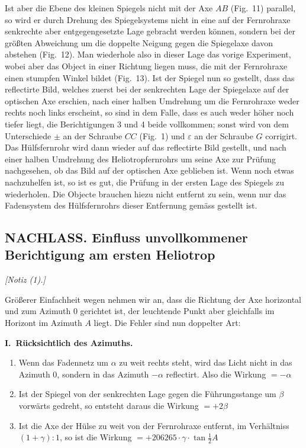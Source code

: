 \documentclass[12pt,a4paper]{article}
\newcommand{\tang}{\tan}
\theoremstyle{plain}
\theoremstyle{definition}
\theoremstyle{remark}
\begin{document}
Ist aber die Ebene des kleinen Spiegels nicht mit der Axe $AB$ (Fig.~11) parallel, so wird er durch Drehung des Spiegelsystems nicht in eine auf der Fernrohraxe senkrechte aber entgegengesetzte Lage gebracht werden k\"onnen, sondern bei der gr\"o\ss ten Abweichung um die doppelte Neigung gegen die Spiegelaxe davon abstehen (Fig.~12). Man wiederhole also in dieser Lage das vorige Experiment, wobei aber das Object in einer Richtung liegen muss, die mit der Fernrohraxe einen stumpfen Winkel bildet (Fig.~13). Ist der Spiegel nun so gestellt, dass das reflectirte Bild, welches zuerst bei der senkrechten Lage der Spiegelaxe auf der optischen Axe erschien, nach einer halben Umdrehung um die Fernrohraxe weder rechts noch links erscheint, so sind in dem Falle, dass es auch weder h\"oher noch tiefer liegt, die Berichtigungen 3 und 4 beide vollkommen; sonst wird von dem Unterschiede $\pm$ an der Schraube $CC$ (Fig.~1) und $\varepsilon$ an der Schraube $G$ corrigirt. Das H\"ulfsfernrohr wird dann wieder auf das reflectirte Bild gestellt, und nach einer halben Umdrehung des Heliotropfernrohrs um seine Axe zur Pr\"ufung nachgesehen, ob das Bild auf der optischen Axe geblieben ist. Wenn noch etwas nachzuhelfen ist, so ist es gut, die Pr\"ufung in der ersten Lage des Spiegels zu wiederholen. Die Objecte brauchen hiezu nicht entfernt zu sein, wenn nur das Fadensystem des H\"ulfsfernrohrs dieser Entfernung gem\"ass gestellt ist.

\subsection*{NACHLASS. Einfluss unvollkommener Berichtigung am ersten Heliotrop}

\noindent
\textit{[Notiz (1).]}

Gr\"o\ss erer Einfachheit wegen nehmen wir an, dass die Richtung der Axe horizontal und zum Azimuth 0 gerichtet ist, der leuchtende Punkt aber gleichfalls im Horizont im Azimuth $A$ liegt. Die Fehler sind nun doppelter Art:

\medskip
\noindent
\textbf{I.\ R\"ucksichtlich des Azimuths.}
\begin{enumerate}[label=\arabic*.]
\item Wenn das Fadennetz um $\alpha$ zu weit rechts steht, wird das Licht nicht in das Azimuth 0, sondern in das Azimuth $-\alpha$ reflectirt. Also die Wirkung $= -\alpha$

\item Ist der Spiegel von der senkrechten Lage gegen die F\"uhrungsstange um $\beta$ vorw\"arts gedreht, so entsteht daraus die Wirkung $= +2\beta$

\item Ist die Axe der H\"ulse zu weit von der Fernrohraxe entfernt, im Verh\"altniss $(1+\gamma):1$, so ist die Wirkung $= +206265 \cdot \gamma \cdot \tang\tfrac{1}{2}A$
\end{enumerate}
\end{document}
